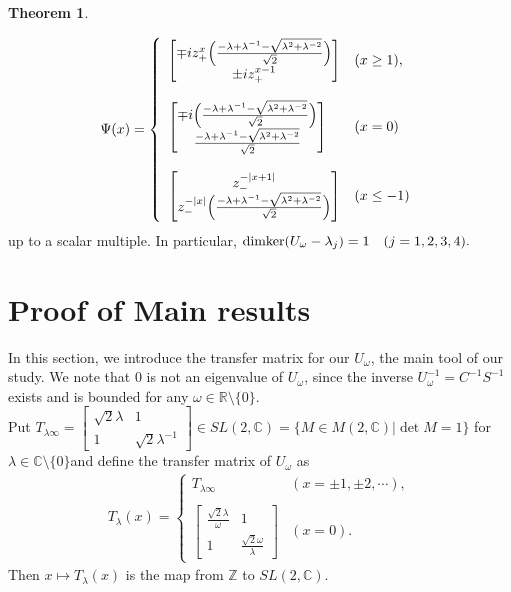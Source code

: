 \documentclass[a4paper,12pt]{article}
\theoremstyle{plain}
\theoremstyle{definition}
\newtheorem{thm}{Theorem}[section]
\theoremstyle{definition}
\begin{document}
\begin{thm}
\begin{itemize}
\begin{eqnarray}
\Psi(x)=
\left\{\begin{array}{ll}
\begin{bmatrix}
\mp i z_{+}^{x} \Bigl(\frac{-\lambda +\lambda^{-1}-\sqrt{\lambda^2+\lambda^{-2}}}{\sqrt{2}} \Bigr) \\
\pm i z_{+}^{x-1}
\end{bmatrix} & (x\geq 1 ), \\\\
\begin{bmatrix}
    \mp i \Bigl(\frac{-\lambda +\lambda^{-1}-\sqrt{\lambda^2+\lambda^{-2}}}{\sqrt{2}} \Bigr) \\
    \frac{-\lambda +\lambda^{-1}-\sqrt{\lambda^2+\lambda^{-2}}}{\sqrt{2}}
\end{bmatrix} & (x=0) \\\\
\begin{bmatrix}
z_{-}^{-|x+1|} \\
z_{-}^{-|x|}\Bigl(\frac{-\lambda +\lambda^{-1}-\sqrt{\lambda^2+\lambda^{-2}}}{\sqrt{2}} \Bigr)
\end{bmatrix} & (x\leq -1)
\end{array}\right. \nonumber
\end{eqnarray}
up to a scalar multiple.
In particular, $ {\rm dim ker} (U_{\omega}-\lambda_{j})=1 \quad (j=1,2,3,4). $
\end{itemize}
\end{thm}



\section{Proof of Main results}

In this section, we introduce the transfer matrix for our $U_\omega$, the main tool of our study. We note that $0$ is not an eigenvalue of $U_{\omega}$, since the inverse $U_{\omega}^{-1}=C^{-1}S^{-1}$ exists and is bounded for any $\omega \in \mathbb{R}\setminus \{ 0 \}$.\\

 Put $T_{\lambda \infty}=\begin{bmatrix}
    \sqrt{2}\lambda & 1\\
    1 & \sqrt{2}\lambda^{-1}
\end{bmatrix} \in SL(2,\mathbb{C})=\{M \in M(2,\mathbb{C})|\det M =1 \}$ for $\lambda \in \mathbb{C}\setminus \{ 0\}$and define the transfer matrix of $U_\omega$ as 
\begin{eqnarray}
T_{\lambda}(x)=
\left\{\begin{array}{ll}
T_{\lambda \infty} & (x= \pm 1, \pm 2, \cdots ), \\\\
\begin{bmatrix}
\frac{\sqrt{2}\lambda}{\omega} & 1 \\ 
1 & \frac{\sqrt{2}\omega}{\lambda}
\end{bmatrix} & (x=0). 
\end{array}\right. \nonumber
\end{eqnarray}
Then $x \mapsto T_{\lambda}(x)$ is the map from $\mathbb{Z}$ to $SL(2,\mathbb{C})$.
\end{document}
